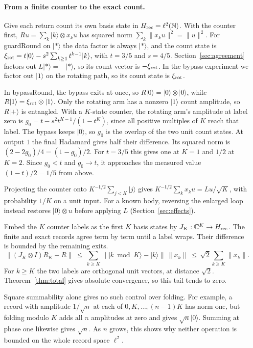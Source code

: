 \documentclass[acmsmall,screen,review,anonymous,nonacm]{acmart}
\newcommand{\C}{\mathbb C}
\newcommand{\N}{\mathbb N}
\newcommand{\storyinlineface}{\small\ttfamily}
\newcommand{\code}[1]{\textnormal{\storyinlineface #1}}
\newcommand{\ket}[1]{\lvert #1\rangle}
\numberwithin{equation}{section}
\begin{document}
\paragraph{From a finite counter to the exact count.}
Give each return count its own basis state in $H_{\rm rec}=\ell^2(\N)$.
With the counter first, $Ru=\sum_k\ket k\otimes x_ku$ has squared norm
$\sum_k\|x_ku\|^2=\|u\|^2$. For \code{guardRound} on $\ket*$ the data
factor is always $\ket*$, and the count state is
$\xi_{\rm rot}=t\ket0-s^2\sum_{k\ge1}t^{k-1}\ket k$, with
$t=3/5$ and $s=4/5$. Section~\ref{sec:agreement} factors out
$L\ket*=-\ket*$, so its count vector is $-\xi_{\rm rot}$.
In the bypass experiment we factor out $\ket1$ on the rotating path, so its count state is $\xi_{\rm rot}$.

In \code{bypassRound}, the bypass exits at once, so $R\ket0=\ket0\otimes\ket0$, while $R\ket1=\xi_{\rm rot}\otimes\ket1$.
Only the rotating arm has a nonzero $\ket1$ count amplitude, so $R\ket+$ is entangled.
With a $K$-state counter, the rotating arm's amplitude at label zero is
$g_0=t-s^2t^{K-1}/(1-t^K)$, since all positive multiples of $K$ reach
that label. The bypass keeps $\ket0$, so $g_0$ is the overlap of
the two unit count states. At output $1$ the final Hadamard gives
half their difference. Its squared norm is $(2-2g_0)/4=(1-g_0)/2$.
For $t=3/5$ this gives one at $K=1$ and $1/2$ at $K=2$. Since $g_0<t$ and $g_0\to t$, it approaches the measured value $(1-t)/2=1/5$ from above.

Projecting the counter onto $K^{-1/2}\sum_{j<K}\ket j$ gives
$K^{-1/2}\sum_k x_ku=Lu/\sqrt K$, with probability $1/K$ on a unit input.
For a known body, reversing the enlarged loop instead restores $\ket0\otimes u$
before applying $L$ (Section~\ref{sec:effects}).

Embed the $K$ counter labels as the first $K$ basis states by
$J_K:\C^K\to H_{\rm rec}$. The finite and exact records agree term by
term until a label wraps. Their difference is bounded by the remaining exits.
\[
 \|(J_K\otimes I)R_K-R\|
 \ \leq\ \sum_{k\ge K}\big\|\ket{k\bmod K}-\ket k\big\|\,\|x_k\|
 \ \leq\ \sqrt2\sum_{k\ge K}\|x_k\| .
\]
For $k\ge K$ the two labels are orthogonal unit vectors, at distance
$\sqrt2$. Theorem~\ref{thm:total} gives absolute convergence, so this tail tends to zero.

Square summability alone gives no such control over folding. For example, a
record with amplitude $1/\sqrt n$ at each of $0,K,\ldots,(n-1)K$ has norm one,
but folding modulo $K$ adds all $n$ amplitudes at zero and gives $\sqrt n\ket0$.
Summing at phase one likewise gives $\sqrt n$. As $n$ grows, this shows why
neither operation is bounded on the whole record space $\ell^2$.
\end{document}
